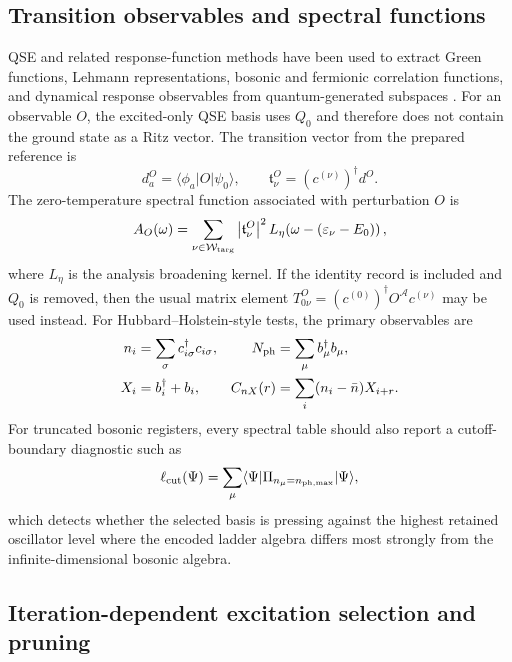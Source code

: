 \documentclass[
  reprint,
  amsmath,
  amssymb,
  aps,
  pra,
  nofootinbib,
  superscriptaddress,
  floatfix
]{revtex4-2}
\newcommand{\Acal}{\mathcal{A}}
\newcommand{\Wcal}{\mathcal{W}}
\newcommand{\phmax}{n_{\mathrm{ph,max}}}
\newcommand{\ket}[1]{|#1\rangle}
\newcommand{\bra}[1]{\langle #1|}
\begin{document}
\subsection{Transition observables and spectral functions}

QSE and related response-function methods have been used to extract Green functions, Lehmann representations, bosonic and fermionic correlation functions, and dynamical response observables from quantum-generated subspaces \cite{Jamet2022GreenQSE,Dhawan2024ImagTimeGreen,Gauthier2024OccupationQSE,Kokcu2024LinearResponse,Umeano2025KitaevQSE}.  For an observable $O$, the excited-only QSE basis uses $Q_0$ and therefore does not contain the ground state as a Ritz vector.  The transition vector from the prepared reference is
\begin{equation}
d_a^O
=
\bra{\phi_a}O\ket{\psi_0},
\qquad
\mathfrak t_\nu^O
=
(c^{(\nu)})^\dagger d^O .
\label{eq:qse_transition}
\end{equation}
The zero-temperature spectral function associated with perturbation $O$ is
\begin{equation}
A_O(\omega)
=
\sum_{\nu\in\Wcal_{\rm targ}}
\left|\mathfrak t_\nu^O\right|^2
L_\eta\!\left(\omega-(\varepsilon_\nu-E_0)\right),
\label{eq:qse_spectral_function}
\end{equation}
where $L_\eta$ is the analysis broadening kernel.  If the identity record is included and $Q_0$ is removed, then the usual matrix element $T_{0\nu}^O=(c^{(0)})^\dagger O^\Acal c^{(\nu)}$ may be used instead.  For Hubbard--Holstein-style tests, the primary observables are
\begin{align}
n_i&=\sum_\sigma c_{i\sigma}^\dagger c_{i\sigma},
&
N_{\rm ph}&=\sum_\mu b_\mu^\dagger b_\mu,
\nonumber\\
X_i&=b_i^\dagger+b_i,
&
C_{nX}(r)&=\sum_i(n_i-\bar n)X_{i+r}.
\label{eq:fb_observables}
\end{align}
For truncated bosonic registers, every spectral table should also report a cutoff-boundary diagnostic such as
\begin{equation}
\ell_{\rm cut}(\Psi)=
\sum_{\mu}\bra{\Psi}\Pi_{n_\mu=\phmax}\ket{\Psi},
\label{eq:boson_cutoff_leakage}
\end{equation}
which detects whether the selected basis is pressing against the highest retained oscillator level where the encoded ladder algebra differs most strongly from the infinite-dimensional bosonic algebra.

\subsection{Iteration-dependent excitation selection and pruning}
\end{document}
